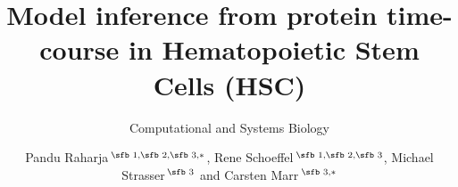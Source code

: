 \documentclass{bioinfo}
\begin{document}

\subtitle{Computational and Systems Biology}

\title[Model inference from protein time-course in Hematopoietic Stem Cells (HSC)]{Model inference from protein time-course in Hematopoietic Stem Cells (HSC)}
\author[Pandu Raharja, Rene Schoeffel, Michael Strasser and Carsten Marr]{Pandu Raharja\,$^{\text{\sfb 1,}\text{\sfb 2,}\text{\sfb 3,}*}$, Rene Schoeffel\,$^{\text{\sfb 1,}\text{\sfb 2,}\text{\sfb 3}}$, Michael Strasser\,$^{\text{\sfb 3}}$ and Carsten Marr\,$^{\text{\sfb 3,}*}$}
\address{$^{\text{\sf 1}}$Technische Universit\"at M\"unchen, Fakult\"at f\"ur Informatik, Boltzmannstr. 3, 85748 Garching bei M\"unchen, Germany\\
$^{\text{\sf 2}}$Ludwig-Maximilians-Universit\"at M\"unchen, Professor-Huber-Platz 2, 80539 M\"unchen, Germany\\
$^{\text{\sf 3}}$Helmholtz Zentrum M\"unchen, Institute of Computational Biology, Ingolst\"adter Landstr. 1
85764 Neuherberg, Germany.}



\end{document}

